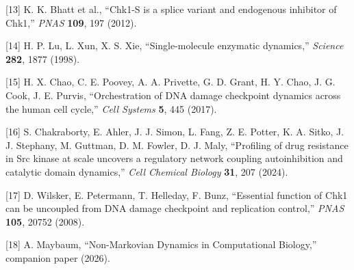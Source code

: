 \documentclass[
]{article}
\begin{document}
{[}13{]} K. K. Bhatt et al., ``Chk1-S is a splice variant and endogenous
inhibitor of Chk1,'' \emph{PNAS} \textbf{109}, 197 (2012).

{[}14{]} H. P. Lu, L. Xun, X. S. Xie, ``Single-molecule enzymatic
dynamics,'' \emph{Science} \textbf{282}, 1877 (1998).

{[}15{]} H. X. Chao, C. E. Poovey, A. A. Privette, G. D. Grant, H. Y.
Chao, J. G. Cook, J. E. Purvis, ``Orchestration of DNA damage checkpoint
dynamics across the human cell cycle,'' \emph{Cell Systems} \textbf{5},
445 (2017).

{[}16{]} S. Chakraborty, E. Ahler, J. J. Simon, L. Fang, Z. E. Potter,
K. A. Sitko, J. J. Stephany, M. Guttman, D. M. Fowler, D. J. Maly,
``Profiling of drug resistance in Src kinase at scale uncovers a
regulatory network coupling autoinhibition and catalytic domain
dynamics,'' \emph{Cell Chemical Biology} \textbf{31}, 207 (2024).

{[}17{]} D. Wilsker, E. Petermann, T. Helleday, F. Bunz, ``Essential
function of Chk1 can be uncoupled from DNA damage checkpoint and
replication control,'' \emph{PNAS} \textbf{105}, 20752 (2008).

{[}18{]} A. Maybaum, ``Non-Markovian Dynamics in Computational
Biology,'' companion paper (2026).
\end{document}
